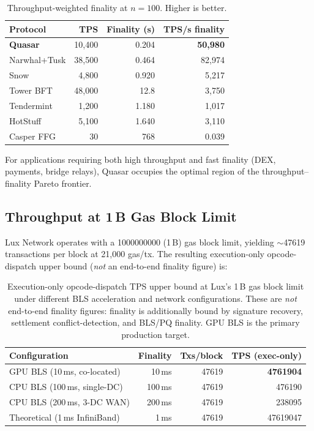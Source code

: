 \begin{table}[h]
\centering
\begin{tabular}{@{}lrrr@{}}
\toprule
\textbf{Protocol} & \textbf{TPS} & \textbf{Finality (s)} & \textbf{TPS/s finality} \\
\midrule
\textbf{Quasar}   & 10{,}400 & 0.204 & \textbf{50{,}980} \\
Narwhal+Tusk      & 38{,}500 & 0.464 & 82{,}974 \\
Snow              & 4{,}800  & 0.920 & 5{,}217 \\
Tower BFT         & 48{,}000 & 12.8  & 3{,}750 \\
Tendermint        & 1{,}200  & 1.180 & 1{,}017 \\
HotStuff          & 5{,}100  & 1.640 & 3{,}110 \\
Casper FFG        & 30       & 768   & 0.039 \\
\bottomrule
\end{tabular}
\caption{Throughput-weighted finality at $n=100$. Higher is better.}
\label{tab:tps-finality}
\end{table}

For applications requiring both high throughput and fast finality (DEX, payments, bridge
relays), Quasar occupies the optimal region of the throughput--finality Pareto frontier.

\subsection{Throughput at 1\,B Gas Block Limit}

Lux Network operates with a \num{1000000000} (1\,B) gas block limit, yielding
$\sim$\num{47619} transactions per block at 21{,}000 gas/tx. The resulting execution-only
opcode-dispatch upper bound (\emph{not} an end-to-end finality figure) is:

\begin{table}[h]
\centering
\begin{tabular}{@{}lrrr@{}}
\toprule
\textbf{Configuration} & \textbf{Finality} & \textbf{Txs/block} & \textbf{TPS (exec-only)} \\
\midrule
GPU BLS (10\,ms, co-located)       & 10\,ms  & \num{47619} & \textbf{\num{4761904}} \\
CPU BLS (100\,ms, single-DC)       & 100\,ms & \num{47619} & \num{476190} \\
CPU BLS (200\,ms, 3-DC WAN)        & 200\,ms & \num{47619} & \num{238095} \\
Theoretical (1\,ms InfiniBand)     & 1\,ms   & \num{47619} & \num{47619047} \\
\bottomrule
\end{tabular}
\caption{Execution-only opcode-dispatch TPS upper bound at Lux's 1\,B gas block limit under
different BLS acceleration and network configurations. These are \emph{not} end-to-end
finality figures: finality is additionally bound by signature recovery, settlement
conflict-detection, and BLS/PQ finality. GPU BLS is the primary production target.}
\label{tab:1b-gas-tps}
\end{table}

